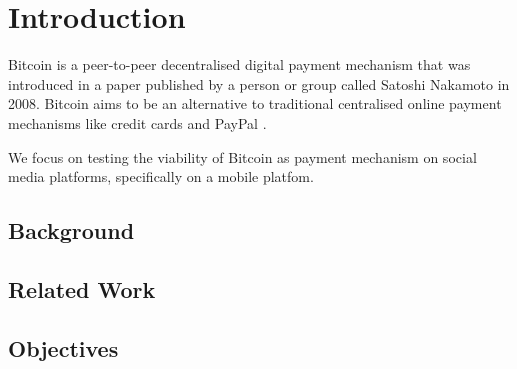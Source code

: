 \chapter{Introduction}
\label{chp:Intro}

Bitcoin \cite{Nakamoto2008} is a peer-to-peer decentralised digital payment mechanism that was introduced in a paper published by a person or group called Satoshi Nakamoto in 2008. Bitcoin aims to be an alternative to traditional centralised online payment mechanisms like credit cards and PayPal \cite{PayPal2015}. 

We focus on testing the viability of Bitcoin as payment mechanism on social media platforms, specifically on a mobile platfom. 


\section{Background}
	

\section{Related Work}

\section{Objectives}


